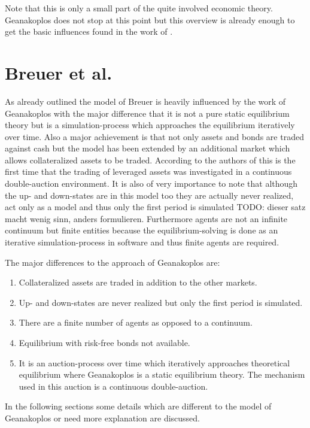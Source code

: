 \documentclass[../Bachelorarbeit.tex]{subfiles}
\begin{document}
\medskip

Note that this is only a small part of the quite involved economic theory. Geanakoplos does not stop at this point but this overview is already enough to get the basic influences found in the work of \cite{Breuer2015}.

\section{Breuer et al.}
As already outlined the model of Breuer is heavily influenced by the work of Geanakoplos with the major difference that it is not a pure static equilibrium theory but is a simulation-process which approaches the equilibrium iteratively over time. Also a major achievement is that not only assets and bonds are traded against cash but the model has been extended by an additional market which allows collateralized assets to be traded. According to the authors of \cite{Breuer2015} this is the first time that the trading of leveraged assets was investigated in a continuous double-auction environment. It is also of very importance to note that although the up- and down-states are in this model too they are actually never realized, act only as a model and thus only the first period is simulated TODO: dieser satz macht wenig sinn, anders formulieren. Furthermore agents are not an infinite continuum but finite entities because the equilibrium-solving is done as an iterative simulation-process in software and thus finite agents are required.

The major differences to the approach of Geanakoplos are:
\begin{enumerate}
\item Collateralized assets are traded in addition to the other markets.
\item Up- and down-states are never realized but only the first period is simulated.
\item There are a finite number of agents as opposed to a continuum.
\item Equilibrium with risk-free bonds not available.
\item It is an auction-process over time which iteratively approaches theoretical equilibrium where Geanakoplos is a static equilibrium theory. The mechanism used in this auction is a continuous double-auction.
\end{enumerate}

In the following sections some details which are different to the model of Geanakoplos or need more explanation are discussed.
\end{document}
